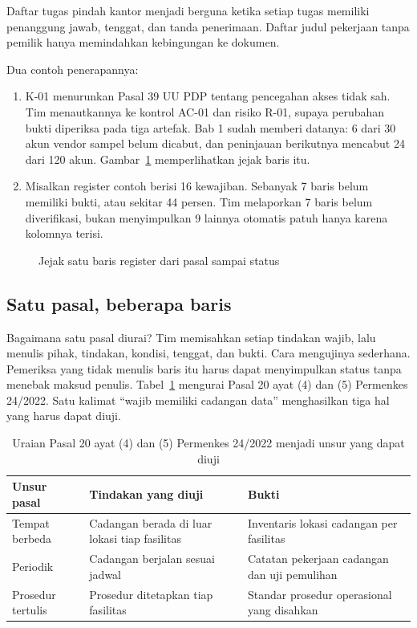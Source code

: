 Daftar tugas pindah kantor menjadi berguna ketika setiap tugas memiliki penanggung jawab, tenggat, dan tanda
penerimaan. Daftar judul pekerjaan tanpa pemilik hanya memindahkan kebingungan ke dokumen.

Dua contoh penerapannya:
\begin{enumerate}
  \item K-01 menurunkan Pasal 39 UU PDP tentang pencegahan akses tidak sah. Tim menautkannya ke kontrol AC-01 dan
  risiko R-01, supaya perubahan bukti diperiksa pada tiga artefak. Bab 1 sudah memberi datanya: 6 dari 30 akun
  vendor sampel belum dicabut, dan peninjauan berikutnya mencabut 24 dari 120 akun.
  Gambar~\ref{fig:ch03-alur} memperlihatkan jejak baris itu.
  \item Misalkan register contoh berisi 16 kewajiban. Sebanyak 7 baris belum memiliki bukti, atau sekitar 44
  persen. Tim melaporkan 7 baris belum diverifikasi, bukan menyimpulkan 9 lainnya otomatis patuh hanya karena
  kolomnya terisi.
\end{enumerate}

\begin{figure}[!htb]
  \centering
  
  \caption{Jejak satu baris register dari pasal sampai status}
  \label{fig:ch03-alur}
\end{figure}

\subsection*{Satu pasal, beberapa baris}

Bagaimana satu pasal diurai? Tim memisahkan setiap tindakan wajib, lalu menulis pihak, tindakan, kondisi, tenggat,
dan bukti. Cara mengujinya sederhana. Pemeriksa yang tidak menulis baris itu harus dapat menyimpulkan status tanpa
menebak maksud penulis. Tabel~\ref{tab:ch03-uraian} mengurai Pasal 20 ayat (4) dan (5) Permenkes 24/2022. Satu
kalimat ``wajib memiliki cadangan data'' menghasilkan tiga hal yang harus dapat diuji.

\begin{table}[!htb]
  \centering\small
  \caption{Uraian Pasal 20 ayat (4) dan (5) Permenkes 24/2022 menjadi unsur yang dapat diuji}
  \label{tab:ch03-uraian}
  \begin{tabularx}{\textwidth}{|>{\raggedright\arraybackslash}p{}|>{\raggedright\arraybackslash}X|>{\raggedright\arraybackslash}X|}
    \hline
    \textbf{Unsur pasal} & \textbf{Tindakan yang diuji} & \textbf{Bukti} \\ \hline
    Tempat berbeda & Cadangan berada di luar lokasi tiap fasilitas & Inventaris lokasi cadangan per fasilitas \\
    \hline
    Periodik & Cadangan berjalan sesuai jadwal & Catatan pekerjaan cadangan dan uji pemulihan \\ \hline
    Prosedur tertulis & Prosedur ditetapkan tiap fasilitas & Standar prosedur operasional yang disahkan \\ \hline
  \end{tabularx}
\end{table}

